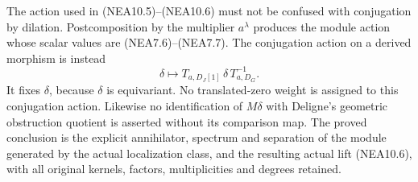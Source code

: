 The action used in (NEA10.5)--(NEA10.6) must not be confused with
conjugation by dilation. Postcomposition by the multiplier \(a^\lambda\)
produces the module action whose scalar values are (NEA7.6)--(NEA7.7).
The conjugation action on a derived morphism is instead \[
\delta\longmapsto T_{a,D_J[1]}\,\delta\,T_{a,D_G}^{-1}.
\tag{NEA10.7}
\] It fixes \(\delta\), because \(\delta\) is equivariant. No
translated-zero weight is assigned to this conjugation action. Likewise
no identification of \(M\delta\) with Deligne's geometric obstruction
quotient is asserted without its comparison map. The proved conclusion
is the explicit annihilator, spectrum and separation of the module
generated by the actual localization class, and the resulting actual
lift (NEA10.6), with all original kernels, factors, multiplicities and
degrees retained.
